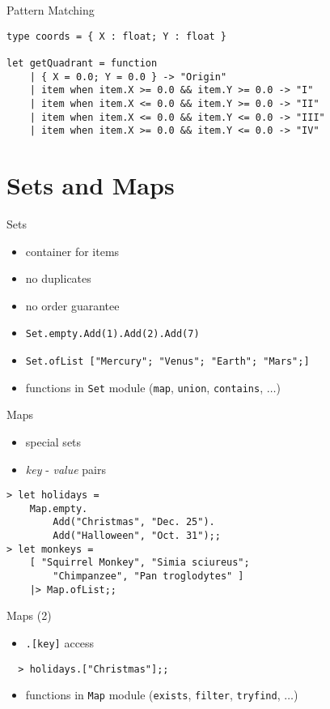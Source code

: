 \documentclass{beamer}
\begin{document}
\begin{frame}[fragile]{Pattern Matching}
  \begin{verbatim}
type coords = { X : float; Y : float }
 
let getQuadrant = function
    | { X = 0.0; Y = 0.0 } -> "Origin"
    | item when item.X >= 0.0 && item.Y >= 0.0 -> "I"
    | item when item.X <= 0.0 && item.Y >= 0.0 -> "II"
    | item when item.X <= 0.0 && item.Y <= 0.0 -> "III"
    | item when item.X >= 0.0 && item.Y <= 0.0 -> "IV"
  \end{verbatim}
\end{frame}

\section{Sets and Maps}
\frame{\tableofcontents[currentsection]}

\begin{frame}{Sets}
  \begin{itemize}[<+->]
    \item container for items
    \item no duplicates
    \item no order guarantee
    \item \texttt{Set.empty.Add(1).Add(2).Add(7)}
    \item \texttt{Set.ofList ["Mercury"; "Venus"; "Earth"; "Mars";]}
    \item functions in \texttt{Set} module (\texttt{map}, \texttt{union},
    \texttt{contains}, $\ldots$)
  \end{itemize}
\end{frame}

\begin{frame}[fragile]{Maps}
  \begin{itemize}[<+->]
    \item special sets
    \item \textit{key} - \textit{value} pairs
  \end{itemize}
  \pause
  \begin{verbatim}
> let holidays =
    Map.empty.
        Add("Christmas", "Dec. 25").
        Add("Halloween", "Oct. 31");;
> let monkeys = 
    [ "Squirrel Monkey", "Simia sciureus";
        "Chimpanzee", "Pan troglodytes" ]
    |> Map.ofList;;
  \end{verbatim}
\end{frame}

\begin{frame}[fragile]{Maps (2)}
  \begin{itemize}[<+->]
    \item \texttt{.[key]} access
  \end{itemize}
  \begin{verbatim}
  > holidays.["Christmas"];;
  \end{verbatim}
  \pause
  \begin{itemize}
    \item functions in \texttt{Map} module (\texttt{exists}, \texttt{filter},
    \texttt{tryfind}, $\ldots$)
  \end{itemize}
\end{frame}
\end{document}
